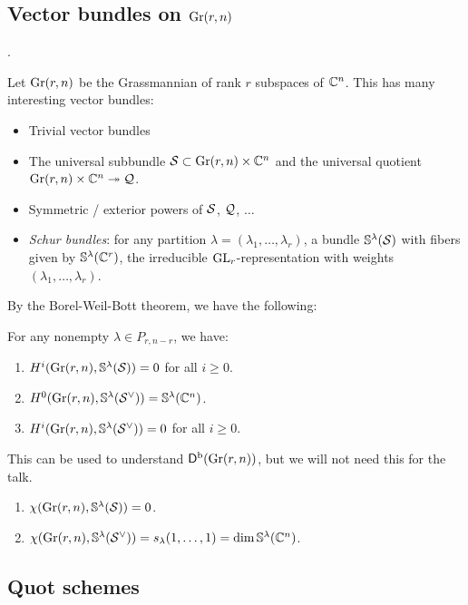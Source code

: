 \documentclass{article}
\begin{document}
\subsection{Vector bundles on $\operatorname{Gr}(r, n)$}.

Let $\operatorname{Gr}(r, n)$ be the Grassmannian of rank $r$ subspaces of $\mathbb{C}^n$.
This has many interesting vector bundles:
\begin{itemize}
	\item Trivial vector bundles
	\item The universal subbundle $\mathcal{S} \subset \operatorname{Gr}(r, n) \times \mathbb{C}^n$ and the universal quotient $\operatorname{Gr}(r, n) \times \mathbb{C}^n \twoheadrightarrow \mathcal{Q}$.
	\item Symmetric / exterior powers of $\mathcal{S}$, $\mathcal{Q}$, $\dots$
	\item \emph{Schur bundles}: for any partition $\lambda = (\lambda_1, \dots, \lambda_r)$, a bundle $\mathbb{S}^\lambda(\mathcal{S})$ with fibers given by $\mathbb{S}^\lambda(\mathbb{C}^r)$, the irreducible $\mathrm{GL}_r$-representation with weights $(\lambda_1, \dots, \lambda_r)$.
\end{itemize}

By the Borel-Weil-Bott theorem, we have the following:

\begin{thm}
	For any nonempty $\lambda \in P_{r,n-r}$, we have:
	\begin{enumerate}
		\item $H^i(\operatorname{Gr}(r, n), \mathbb{S}^\lambda(\mathcal{S})) = 0$ for all $i \geq 0$.
		\item $H^0(\operatorname{Gr}(r, n), \mathbb{S}^\lambda(\mathcal{S}^\vee)) = \mathbb{S}^\lambda(\mathbb{C}^n)$.
		\item $H^i(\operatorname{Gr}(r, n), \mathbb{S}^\lambda(\mathcal{S}^\vee)) = 0$ for all $i \geq 0$.
	\end{enumerate}
\end{thm}

This can be used to understand $\mathsf{D}^{\mathrm{b}}(\operatorname{Gr}(r, n))$, but we will not need this for the talk.

\begin{cor}
	\begin{enumerate}
		\item $\chi(\operatorname{Gr}(r, n), \mathbb{S}^\lambda(\mathcal{S})) = 0$.
		\item $\chi(\operatorname{Gr}(r, n), \mathbb{S}^\lambda(\mathcal{S}^\vee)) = s_\lambda(1, \dots, 1) = \dim \mathbb{S}^\lambda(\mathbb{C}^n)$.
	\end{enumerate}
\end{cor}

\subsection{Quot schemes}
\end{document}
